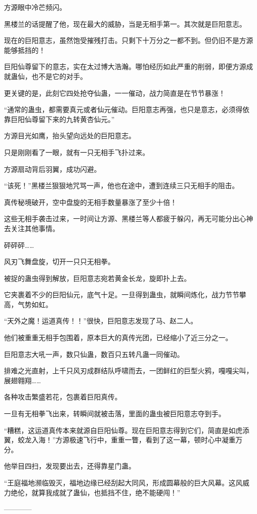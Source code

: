 \begin{this_body}
方源眼中冷芒频闪。

黑楼兰的话提醒了他，现在最大的威胁，当是无相手第一。其次就是巨阳意志。

现在的巨阳意志，虽然饱受摧残打击。只剩下十万分之一都不到。但仍旧不是方源能够抵挡的！

巨阳仙尊留下的意志，实在太过博大浩瀚。哪怕经历如此严重的削弱，即便方源成就蛊仙，也不是它的对手。

更关键的是，此刻它四处抢夺仙蛊，一一催动，战力简直是在节节暴涨！

“通常的蛊虫，都需要真元或者仙元催动。巨阳意志再强，也只是意志，必须得依靠巨阳仙尊留下来的九转黄杏仙元。”

方源目光如鹰，抬头望向远处的巨阳意志。

只是刚刚看了一眼，就有一只无相手飞扑过来。

方源扇动背后羽翼，成功闪避。

“该死！”黑楼兰狠狠地咒骂一声，他也在途中，遭到连续三只无相手的阻击。

真传秘境破开，空中盘旋的无相手数量暴涨了至少十倍！

这些无相手袭击过来，一时间让方源、黑楼兰等人都疲于躲闪，再无可能分出心神去关注其他事情。

砰砰砰……

风刃飞舞盘旋，切开一只只无相拳。

被捉的蛊虫得到解放，巨阳意志宛若黄金长龙，旋即扑上去。

它夹裹着不少的巨阳仙元，底气十足。一旦得到蛊虫，就瞬间炼化，战力节节攀高，气势如虹。

“天外之魔！运道真传！！”很快，巨阳意志发现了马、赵二人。

他们被重重无相手包围着，原本巨大的真传光团，已经缩小了近三分之一。

巨阳意志大吼一声，数只仙蛊，数百只五转凡蛊一同催动。

排难之光直射，上千只风刃成群结队呼啸而去，一团鲜红的巨型火鸦，嘎嘎尖叫，展翅翱翔……

各种攻击繁盛若花，包裹着巨阳真传。

一旦有无相拳飞出来，转瞬间就被击落，里面的蛊虫被巨阳意志夺到手。

“糟糕，这运道真传本来就源自巨阳仙尊。现在巨阳意志得到它们，简直是如虎添翼，蛟龙入海！”方源极速飞行中，重重一瞥，看到了这一幕，顿时心中凝重万分。

他举目四扫，发现要出去，还得靠星门蛊。

“王庭福地濒临毁灭，福地边缘已经刮起大同风，形成圆幕般的巨大风幕。这风威力绝伦，就算我成就了蛊仙，也抵挡不住，绝不能硬闯！”

------------

\end{this_body}

